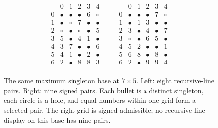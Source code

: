 \begin{figure}[ht]
\centering
\[
\begin{array}{c|ccccc}
 &0&1&2&3&4\\\hline
0&\bullet&\bullet&\bullet&6&\circ\\
1&\bullet&\circ&7&\bullet&\bullet\\
2&\circ&\bullet&\circ&\bullet&5\\
3&5&\bullet&4&1&\bullet\\
4&3&7&\bullet&\bullet&6\\
5&4&1&\bullet&2&\bullet\\
6&2&\bullet&8&8&3\\
\end{array}\qquad\begin{array}{c|ccccc}
 &0&1&2&3&4\\\hline
0&\bullet&\bullet&\bullet&7&\circ\\
1&\bullet&1&3&\bullet&\bullet\\
2&3&\bullet&4&\bullet&7\\
3&\circ&\bullet&6&5&\bullet\\
4&5&2&\bullet&\bullet&1\\
5&6&8&\bullet&8&\bullet\\
6&2&\bullet&9&9&4\\
\end{array}
\]
\caption{The same maximum singleton base at $7\times5$.
Left: eight recursive-line pairs. Right: nine signed pairs.
Each bullet is a distinct singleton, each circle is a hole, and equal
numbers within one grid form a selected pair. The right grid is signed
admissible; no recursive-line display on this base has nine pairs.}
\label{fig:fixed-base-gap}
\end{figure}
